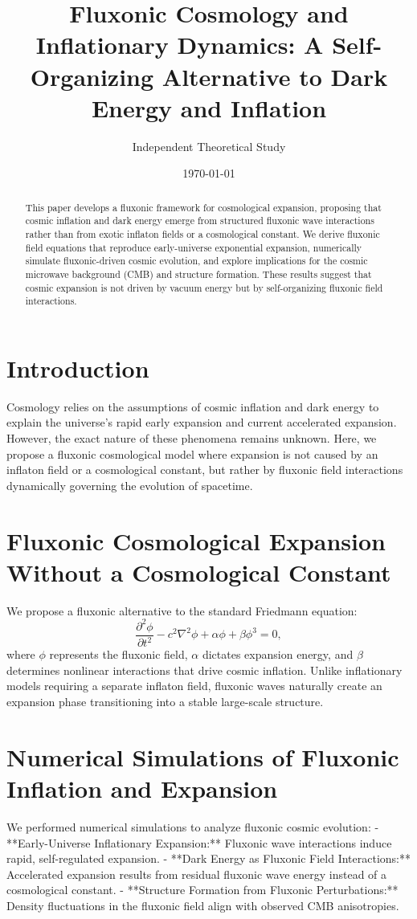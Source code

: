 \documentclass{article}
\title{Fluxonic Cosmology and Inflationary Dynamics: A Self-Organizing Alternative to Dark Energy and Inflation}
\author{Independent Theoretical Study}
\date{\today}
\begin{document}
\maketitle

\begin{abstract}
This paper develops a fluxonic framework for cosmological expansion, proposing that cosmic inflation and dark energy emerge from structured fluxonic wave interactions rather than from exotic inflaton fields or a cosmological constant. We derive fluxonic field equations that reproduce early-universe exponential expansion, numerically simulate fluxonic-driven cosmic evolution, and explore implications for the cosmic microwave background (CMB) and structure formation. These results suggest that cosmic expansion is not driven by vacuum energy but by self-organizing fluxonic field interactions.
\end{abstract}

\section{Introduction}
Cosmology relies on the assumptions of cosmic inflation and dark energy to explain the universe’s rapid early expansion and current accelerated expansion. However, the exact nature of these phenomena remains unknown. Here, we propose a fluxonic cosmological model where expansion is not caused by an inflaton field or a cosmological constant, but rather by fluxonic field interactions dynamically governing the evolution of spacetime.

\section{Fluxonic Cosmological Expansion Without a Cosmological Constant}
We propose a fluxonic alternative to the standard Friedmann equation:
\begin{equation}
    \frac{\partial^2 \phi}{\partial t^2} - c^2 \nabla^2 \phi + \alpha \phi + \beta \phi^3 = 0,
\end{equation}
where \( \phi \) represents the fluxonic field, \( \alpha \) dictates expansion energy, and \( \beta \) determines nonlinear interactions that drive cosmic inflation. Unlike inflationary models requiring a separate inflaton field, fluxonic waves naturally create an expansion phase transitioning into a stable large-scale structure.

\section{Numerical Simulations of Fluxonic Inflation and Expansion}
We performed numerical simulations to analyze fluxonic cosmic evolution:
- **Early-Universe Inflationary Expansion:** Fluxonic wave interactions induce rapid, self-regulated expansion.
- **Dark Energy as Fluxonic Field Interactions:** Accelerated expansion results from residual fluxonic wave energy instead of a cosmological constant.
- **Structure Formation from Fluxonic Perturbations:** Density fluctuations in the fluxonic field align with observed CMB anisotropies.
\end{document}
